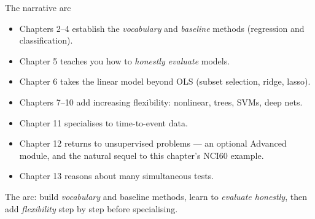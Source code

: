 \documentclass[aspectratio=169,11pt]{beamer}
\begin{document}
\begin{frame}{The narrative arc}
  \begin{itemize}
    \item Chapters 2--4 establish the \emph{vocabulary} and
          \emph{baseline} methods (regression and classification).
    \item Chapter 5 teaches you how to \emph{honestly evaluate}
          models.
    \item Chapter 6 takes the linear model beyond OLS (subset
          selection, ridge, lasso).
    \item Chapters 7--10 add increasing flexibility: nonlinear, trees,
          SVMs, deep nets.
    \item Chapter 11 specialises to time-to-event data.
    \item Chapter 12 returns to unsupervised problems --- an optional
          Advanced module, and the natural sequel to this chapter's
          NCI60 example.
    \item Chapter 13 reasons about many simultaneous tests.
  \end{itemize}
  \begin{takeaway}The arc: build \emph{vocabulary} and baseline methods, learn to \emph{evaluate honestly}, then add \emph{flexibility} step by step before specialising.\end{takeaway}
\end{frame}
\end{document}
